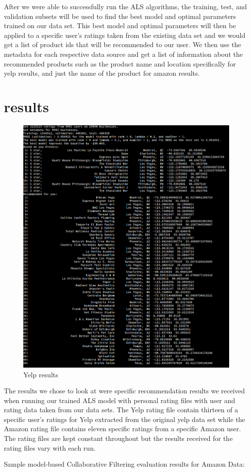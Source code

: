 \documentclass[conference]{IEEEtran}
\begin{document}
After we were able to successfully run the ALS algorithms, the training, test, and validation subsets will be used to find the best model and optimal parameters trained on our data set.  This best model and optimal parameters will then be applied to a specific user's ratings taken from the existing data set and we would get a list of product ids that will be recommended to our user.  We then use the metadata for each respective data source and get a list of information about the recommended products such as the product name and location specifically for yelp results, and just the name of the product for amazon results.


\section{results}

\begin{figure}
  \centering
  \includegraphics[width=.48\textwidth, clip=true, trim = 0cm 18cm 7cm 1cm]{image/yelp_results}
  \caption{Yelp results}
  \label{fig:yelp.cmd.results}
\end{figure}

The results we chose to look at were specific recommendation results we received when running our trained ALS model with personal rating files with user and rating data taken from our data sets.  The Yelp rating file contain thirteen of a specific user's ratings for Yelp extracted from the original yelp data set while the Amazon rating file contains eleven specific ratings from a specific Amazon user.  The rating files are kept constant throughout but the results received for the rating files vary with each run.

Sample model-based Collaborative Filtering evaluation results for Amazon Data: 
\end{document}
